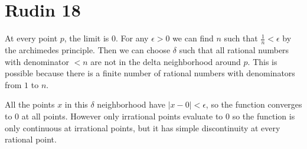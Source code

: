 \documentclass{article}
\begin{document}
\section*{Rudin 18}
At every point $p$, the limit is $0$.
For any $\epsilon > 0$ we can find $n$ such that  $\frac{1}{n} < \epsilon$
by the archimedes principle.
Then we can choose $\delta$ such that all rational numbers with 
denominator $<n$ are not in the delta neighborhood around $p$.
This is possible because there is a finite number of rational numbers
with denominators from $1$ to $n$.

All the points $x$ in this $\delta$ neighborhood have $|x - 0| < \epsilon$,
so the function converges to $0$ at all points.
However only irrational points evaluate to $0$
so the function is only continuous at irrational points, but 
it has simple discontinuity at every rational point.
\end{document}
